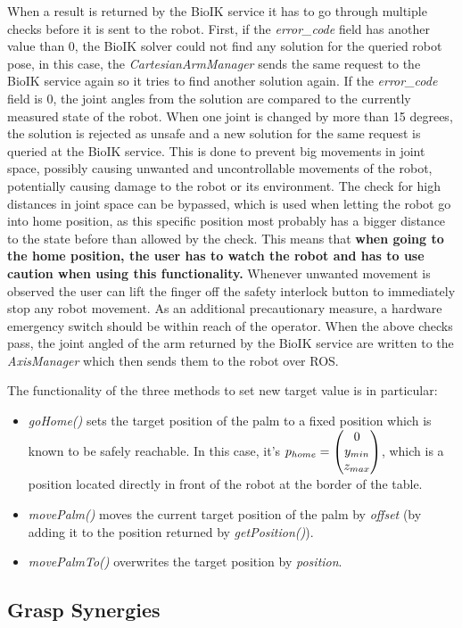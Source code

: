 When a result is returned by the BioIK service it has to go through multiple checks before it is sent to the robot. First, if the \textit{error\_code} field has another value than $0$, the BioIK solver could not find any solution for the queried robot pose, in this case, the \textit{CartesianArmManager} sends the same request to the BioIK service again so it tries to find another solution again. If the \textit{error\_code} field is $0$, the joint angles from the solution are compared to the currently measured state of the robot. When one joint is changed by more than 15 degrees, the solution is rejected as unsafe and a new solution for the same request is queried at the BioIK service. This is done to prevent big movements in joint space, possibly causing unwanted and uncontrollable movements of the robot, potentially causing damage to the robot or its environment. The check for high distances in joint space can be bypassed, which is used when letting the robot go into home position, as this specific position most probably has a bigger distance to the state before than allowed by the check. This means that \textbf{when going to the home position, the user has to watch the robot and has to use caution when using this functionality.} Whenever unwanted movement is observed the user can lift the finger off the safety interlock button to immediately stop any robot movement. As an additional precautionary measure, a hardware emergency switch should be within reach of the operator. When the above checks pass, the joint angled of the arm returned by the BioIK service are written to the \textit{AxisManager} which then sends them to the robot over ROS.

The functionality of the three methods to set new target value is in particular:
\begin{itemize}
	\item \textit{goHome()} sets the target position of the palm to a fixed position which is known to be safely reachable. In this case, it's $p_{home} = \left( \begin{matrix} 0 \\ y_{min} \\ z_{max} \end{matrix} \right)$, which is a position located directly in front of the robot at the border of the table.
	\item \textit{movePalm()} moves the current target position of the palm by \textit{offset} (by adding it to the position returned by \textit{getPosition()}).
	\item \textit{movePalmTo()} overwrites the target position by \textit{position}.
\end{itemize}

\subsection{Grasp Synergies}

